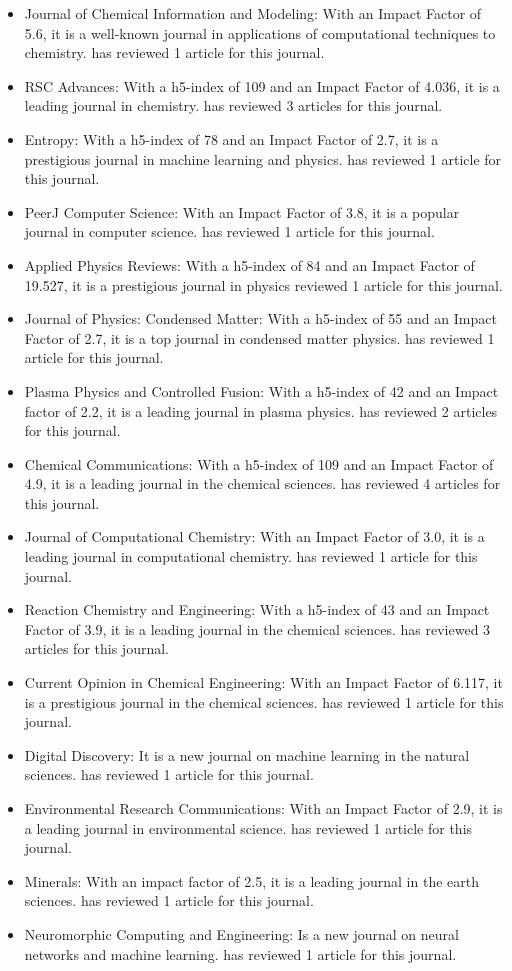 \documentclass[11pt]{article}
\begin{document}
\begin{itemize}
    \item Journal of Chemical Information and Modeling: With an Impact Factor of 5.6, it is a well-known journal in applications of computational techniques to chemistry. \dr has reviewed 1 article for this journal.
    \item RSC Advances: With a h5-index of 109 and an Impact Factor of 4.036, it is a leading journal in chemistry. \dr has reviewed 3 articles for this journal.
    \item Entropy: With a h5-index of 78 and an Impact Factor of 2.7, it is a prestigious journal in machine learning and physics. \dr has reviewed 1 article for this journal.
    \item PeerJ Computer Science: With an Impact Factor of 3.8, it is a popular journal in computer science. \dr has reviewed 1 article for this journal.
    \item Applied Physics Reviews: With a h5-index of 84 and an Impact Factor of 19.527, it is a prestigious journal in physics \dr reviewed 1 article for this journal.
    \item Journal of Physics: Condensed Matter: With a h5-index of 55 and an Impact Factor of 2.7, it is a top journal in condensed matter physics. \dr has reviewed 1 article for this journal.
    \item Plasma Physics and Controlled Fusion: With a h5-index of 42 and an Impact factor of 2.2, it is a leading journal in plasma physics. \dr has reviewed 2 articles for this journal.
    \item Chemical Communications: With a h5-index of 109 and an Impact Factor of 4.9, it is a leading journal in the chemical sciences. \dr has reviewed 4 articles for this journal.
    \item Journal of Computational Chemistry: With an Impact Factor of 3.0, it is a leading journal in computational chemistry. \dr has reviewed 1 article for this journal.
    \item Reaction Chemistry and Engineering: With a h5-index of 43 and an Impact Factor of 3.9, it is a leading journal in the chemical sciences. \dr has reviewed 3 articles for this journal.
    \item Current Opinion in Chemical Engineering: With an Impact Factor of 6.117, it is a prestigious journal in the chemical sciences. \dr has reviewed 1 article for this journal.
    \item Digital Discovery: It is a new journal on machine learning in the natural sciences. \dr has reviewed 1 article for this journal.
    \item Environmental Research Communications: With an Impact Factor of 2.9, it is a leading journal in environmental science. \dr has reviewed 1 article for this journal.
    \item Minerals: With an impact factor of 2.5, it is a leading journal in the earth sciences. \dr has reviewed 1 article for this journal.
    \item Neuromorphic Computing and Engineering: Is a new journal on neural networks and machine learning. \dr has reviewed 1 article for this journal.
\end{itemize}
\end{document}
